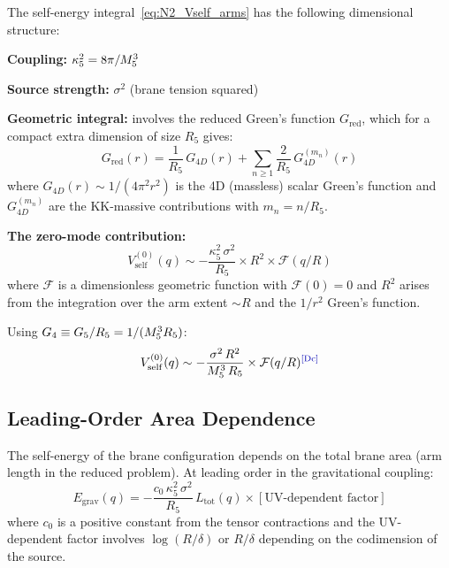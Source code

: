 \begin{derivationbox}[title=Self-Energy Scaling Argument]
The self-energy integral~\eqref{eq:N2_Vself_arms} has the following
dimensional structure:

\textbf{Coupling:} $\kappa_5^2 = 8\pi/M_5^3$

\textbf{Source strength:} $\sigma^2$ (brane tension squared)

\textbf{Geometric integral:} involves the reduced Green's function
$G_{\mathrm{red}}$, which for a compact extra dimension of size $R_5$
gives:
\begin{equation}
    G_{\mathrm{red}}(r) = \frac{1}{R_5}\,G_{4D}(r)
    + \sum_{n \geq 1} \frac{2}{R_5}\,
    G_{4D}^{(m_n)}(r)
    \label{eq:N2_Green_KK}
\end{equation}
where $G_{4D}(r) \sim 1/(4\pi^2 r^2)$ is the 4D (massless) scalar
Green's function and $G_{4D}^{(m_n)}$ are the KK-massive contributions
with $m_n = n/R_5$.

\textbf{The zero-mode contribution:}
\begin{equation}
    V_{\mathrm{self}}^{(0)}(q) \sim -\frac{\kappa_5^2\,\sigma^2}{R_5}
    \times R^2 \times \mathcal{F}(q/R)
    \label{eq:N2_Vself_zero}
\end{equation}
where $\mathcal{F}$ is a dimensionless geometric function with
$\mathcal{F}(0) = 0$ and $R^2$ arises from the integration over the
arm extent $\sim R$ and the $1/r^2$ Green's function.

Using $G_4 \equiv G_5/R_5 = 1/(M_5^3 R_5)$:
\begin{equation}
    V_{\mathrm{self}}^{(0)}(q) \sim -\frac{\sigma^2\, R^2}{\Mfive^3\, R_5}
    \times \mathcal{F}(q/R)
    \label{eq:N2_Vself_scaling}
    \tagDc
\end{equation}
\end{derivationbox}

\subsection{Leading-Order Area Dependence}
\label{sec:N2:area}

The self-energy of the brane configuration depends on the total brane
area (arm length in the reduced problem). At leading order in the
gravitational coupling:
\begin{equation}
    E_{\mathrm{grav}}(q) = -\frac{c_0\,\kappa_5^2\,\sigma^2}{R_5}\,
    L_{\mathrm{tot}}(q) \times [\text{UV-dependent factor}]
    \label{eq:N2_Egrav_LO}
\end{equation}
where $c_0$ is a positive constant from the tensor contractions and
the UV-dependent factor involves $\log(R/\delta)$ or $R/\delta$
depending on the codimension of the source.

